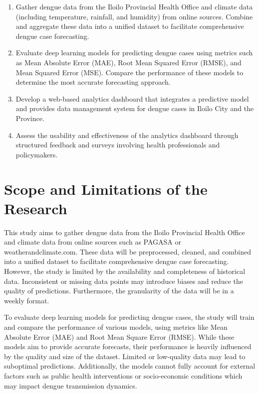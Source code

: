\begin{enumerate}
	\item Gather dengue data from the Iloilo Provincial Health Office and climate data (including temperature, rainfall, and humidity) from online sources. Combine and aggregate these data into a unified dataset to facilitate comprehensive dengue case forecasting.
	\item Evaluate deep learning models for predicting dengue cases using metrics such as Mean Absolute Error (MAE), Root Mean Squared Error (RMSE), and Mean Squared Error (MSE). Compare the performance of these models to determine the most accurate forecasting approach.
	\item Develop a web-based analytics dashboard that integrates a predictive model and provides data management  system for dengue cases in  Iloilo City and the Province.
	\item Assess the usability and effectiveness of the analytics dashboard through structured feedback and surveys involving health professionals and policymakers.
\end{enumerate}


\section{Scope and Limitations of the Research}
\label{sec:scopelimitations}

This study aims to gather dengue data from the Iloilo Provincial Health Office and climate data from online sources such as PAGASA or weatherandclimate.com. These data will be preprocessed, cleaned, and combined into a unified dataset to facilitate comprehensive dengue case forecasting. However, the study is limited by the availability and completeness of historical data. Inconsistent or missing data points may introduce biases and reduce the quality of predictions. Furthermore, the granularity of the data will be in a weekly format.

To evaluate deep learning models for predicting dengue cases, the study will train and compare the performance of various models, using metrics like Mean Absolute Error (MAE) and Root Mean Square Error (RMSE). While these models aim to provide accurate forecasts, their performance is heavily influenced by the quality and size of the dataset. Limited or low-quality data may lead to suboptimal predictions. Additionally, the models cannot fully account for external factors such as public health interventions or socio-economic conditions which may impact dengue transmission dynamics.

